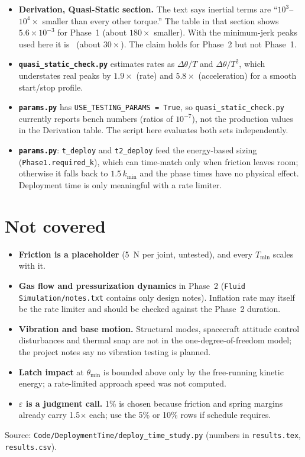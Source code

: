 \documentclass[11pt]{article}
\begin{document}
\begin{itemize}
  \item \textbf{Derivation, Quasi-Static section.} The text says inertial terms are
        ``$10^3$--$10^4\times$ smaller than every other torque.'' The table in that section shows
        $5.6\times10^{-3}$ for Phase~1 (about $180\times$ smaller). With the minimum-jerk peaks used here it is
        \ratioAP\ (about $30\times$). The claim holds for Phase~2 but not Phase~1.
  \item \textbf{\texttt{quasi\_static\_check.py}} estimates rates as $\Delta\theta/T$ and
        $\Delta\theta/T^2$, which understates real peaks by $1.9\times$ (rate) and $5.8\times$
        (acceleration) for a smooth start/stop profile.
  \item \textbf{\texttt{params.py}} has \texttt{USE\_TESTING\_PARAMS = True}, so
        \texttt{quasi\_static\_check.py} currently reports bench numbers (ratios of $10^{-7}$),
        not the production values in the Derivation table. The script here evaluates both sets
        independently.
  \item \textbf{\texttt{params.py}}: \texttt{t\_deploy} and \texttt{t2\_deploy} feed the
        energy-based sizing (\texttt{Phase1.required\_k}), which can time-match only when
        friction leaves room; otherwise it falls back to $1.5\,k_{\min}$ and the phase times have
        no physical effect. Deployment time is only meaningful with a rate limiter.
\end{itemize}

\section{Not covered}\label{sec:caveats}

\begin{itemize}
  \item \textbf{Friction is a placeholder} (5~N per joint, untested), and every $T_{\min}$ scales with it.
  \item \textbf{Gas flow and pressurization dynamics} in Phase~2 (\texttt{Fluid Simulation/notes.txt}
        contains only design notes). Inflation rate may itself be the rate limiter and should be
        checked against the Phase~2 duration.
  \item \textbf{Vibration and base motion.} Structural modes, spacecraft attitude control
        disturbances and thermal snap are not in the one-degree-of-freedom model; the project notes
        say no vibration testing is planned.
  \item \textbf{Latch impact} at $\theta_{\min}$ is bounded above only by the free-running kinetic
        energy; a rate-limited approach speed was not computed.
  \item \textbf{$\varepsilon$ is a judgment call.} 1\% is chosen because friction and spring
        margins already carry 1.5$\times$ each; use the 5\% or 10\% rows if schedule requires.
\end{itemize}

\noindent Source: \texttt{Code/DeploymentTime/deploy\_time\_study.py} (numbers in
\texttt{results.tex}, \texttt{results.csv}).
\end{document}
